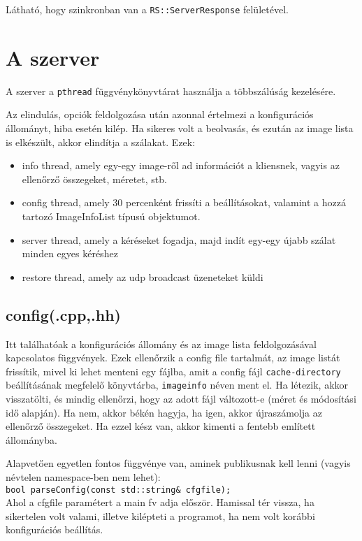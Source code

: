\documentclass[fleqn,10pt,a4paper,titlepage]{article}
\begin{document}
  Látható, hogy szinkronban van a \texttt{RS::ServerResponse} felületével.
  
  \newpage
  \section{A szerver}
  A szerver a \texttt{pthread} függvénykönyvtárat használja a többszálúság kezelésére.

  Az elindulás, opciók feldolgozása után azonnal értelmezi a konfigurációs állományt, hiba esetén kilép. Ha sikeres volt
  a beolvasás, és ezután az image lista is elkészült, akkor elindítja a szálakat. Ezek:
  \begin{itemize}
    \item info thread, amely egy-egy image-ről ad információt a kliensnek, vagyis az ellenőrző összegeket, méretet, stb.
    \item config thread, amely 30 percenként frissíti a beállításokat, valamint a hozzá tartozó ImageInfoList típusú
    objektumot.
    \item server thread, amely a kéréseket fogadja, majd indít egy-egy újabb szálat minden egyes kéréshez
    \item restore thread, amely az udp broadcast üzeneteket küldi
  \end{itemize}
  
  \subsection{config(.cpp,.hh)}
  Itt találhatóak a konfigurációs állomány és az image lista feldolgozásával kapcsolatos függvények. Ezek ellenőrzik a
  config file tartalmát, az image listát frissítik, mivel ki lehet menteni egy fájlba, amit a config fájl
  \texttt{cache-directory} beállításának megfelelő könyvtárba, \texttt{imageinfo} néven ment el. Ha létezik, akkor
  visszatölti, és mindig ellenőrzi, hogy az adott fájl változott-e (méret és módosítási idő alapján). Ha nem, akkor
  békén hagyja, ha igen, akkor újraszámolja az ellenőrző összegeket. Ha ezzel kész van, akkor kimenti a fentebb említett
  állományba.

  Alapvetően egyetlen fontos függvénye van, aminek publikusnak kell lenni (vagyis névtelen namespace-ben nem lehet):\\

  \texttt{bool parseConfig(const std::string\& cfgfile);}\\

  Ahol a cfgfile paramétert a main fv adja először. Hamissal tér vissza, ha sikertelen volt valami, illetve kilépteti a
  programot, ha nem volt korábbi konfigurációs beállítás.
  
\end{document}
